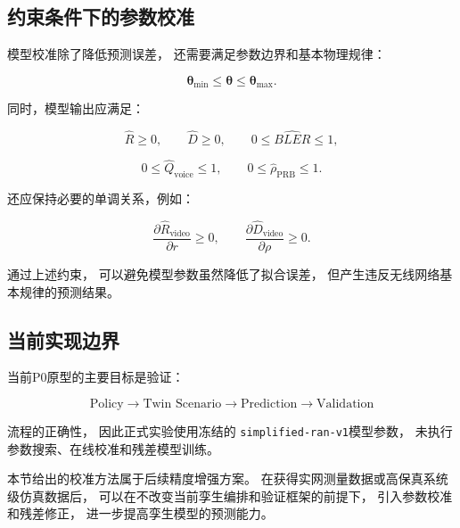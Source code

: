 \documentclass[lang=cn,12pt]{elegantbook}
\begin{document}
\subsection*{约束条件下的参数校准}

模型校准除了降低预测误差，
还需要满足参数边界和基本物理规律：

\begin{equation}
\boldsymbol{\theta}_{\min}
\leq
\boldsymbol{\theta}
\leq
\boldsymbol{\theta}_{\max}.
\label{eq:twin_parameter_bounds}
\end{equation}

同时，模型输出应满足：

\begin{equation}
\hat{R}\geq0,
\qquad
\hat{D}\geq0,
\qquad
0\leq\widehat{BLER}\leq1,
\label{eq:twin_output_bounds_one}
\end{equation}

\begin{equation}
0\leq
\hat{Q}_{\mathrm{voice}}
\leq1,
\qquad
0\leq
\hat{\rho}_{\mathrm{PRB}}
\leq1.
\label{eq:twin_output_bounds_two}
\end{equation}

还应保持必要的单调关系，例如：

\begin{equation}
\frac{\partial \hat{R}_{\mathrm{video}}}
{\partial r}
\geq0,
\qquad
\frac{\partial \hat{D}_{\mathrm{video}}}
{\partial \rho}
\geq0.
\label{eq:twin_monotonic_constraints}
\end{equation}

通过上述约束，
可以避免模型参数虽然降低了拟合误差，
但产生违反无线网络基本规律的预测结果。


\subsection*{当前实现边界}

当前P0原型的主要目标是验证：

\begin{equation}
\text{Policy}
\rightarrow
\text{Twin Scenario}
\rightarrow
\text{Prediction}
\rightarrow
\text{Validation}
\end{equation}

流程的正确性，
因此正式实验使用冻结的
\texttt{simplified-ran-v1}模型参数，
未执行参数搜索、在线校准和残差模型训练。

本节给出的校准方法属于后续精度增强方案。
在获得实网测量数据或高保真系统级仿真数据后，
可以在不改变当前孪生编排和验证框架的前提下，
引入参数校准和残差修正，
进一步提高孪生模型的预测能力。
\end{document}
